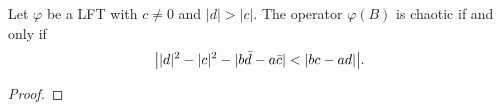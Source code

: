 \begin{theorem}
Let $\varphi$ be a LFT with $c \neq 0$ and $|d| > |c|$.  The operator $\varphi(B)$ is chaotic if and only if 
\[\bigl\lvert |d|^2 - |c|^2 - |b\bar{d} - a\bar{c}| < |bc - ad| \bigr\rvert.\]
\end{theorem}

\begin{proof}

\end{proof}